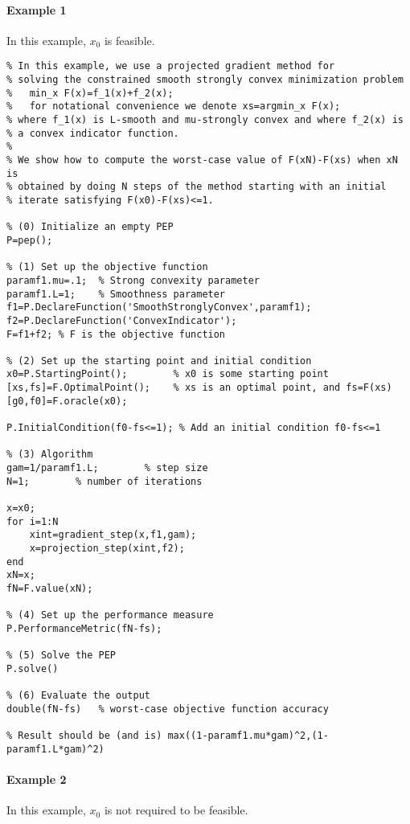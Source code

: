 \documentclass[11pt,a4paper]{article}
\begin{document}
		\paragraph{Example 1} In this example, $x_0$ is feasible.
		\begin{lstlisting}
% In this example, we use a projected gradient method for
% solving the constrained smooth strongly convex minimization problem
%   min_x F(x)=f_1(x)+f_2(x);
%   for notational convenience we denote xs=argmin_x F(x);
% where f_1(x) is L-smooth and mu-strongly convex and where f_2(x) is
% a convex indicator function.
%
% We show how to compute the worst-case value of F(xN)-F(xs) when xN is
% obtained by doing N steps of the method starting with an initial
% iterate satisfying F(x0)-F(xs)<=1.

% (0) Initialize an empty PEP
P=pep();

% (1) Set up the objective function
paramf1.mu=.1;	% Strong convexity parameter
paramf1.L=1;    % Smoothness parameter
f1=P.DeclareFunction('SmoothStronglyConvex',paramf1);
f2=P.DeclareFunction('ConvexIndicator');
F=f1+f2; % F is the objective function

% (2) Set up the starting point and initial condition
x0=P.StartingPoint();		 % x0 is some starting point
[xs,fs]=F.OptimalPoint(); 	 % xs is an optimal point, and fs=F(xs)
[g0,f0]=F.oracle(x0);

P.InitialCondition(f0-fs<=1); % Add an initial condition f0-fs<=1

% (3) Algorithm
gam=1/paramf1.L;		% step size
N=1;		% number of iterations

x=x0;
for i=1:N
	xint=gradient_step(x,f1,gam);
	x=projection_step(xint,f2);
end
xN=x;
fN=F.value(xN);

% (4) Set up the performance measure
P.PerformanceMetric(fN-fs);

% (5) Solve the PEP
P.solve()

% (6) Evaluate the output
double(fN-fs)   % worst-case objective function accuracy

% Result should be (and is) max((1-paramf1.mu*gam)^2,(1-paramf1.L*gam)^2)
		\end{lstlisting}
		\newpage
		\paragraph{Example 2} In this example, $x_0$ is not required to be feasible.
\end{document}
